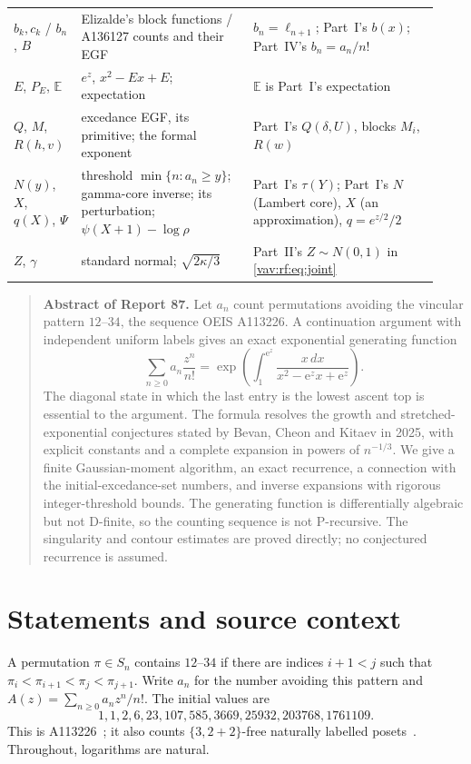 \documentclass[11pt]{article}
\theoremstyle{remark}\newtheorem{remark}[theorem]{Remark}
\newcommand{\E}{\mathbb E}
\newcommand{\ee}{\mathrm e}
\begin{document}
\begin{table}[H]
\begin{tabular}{@{}>{\raggedright}p{0.14\linewidth}>{\raggedright}p{0.38\linewidth}>{\raggedright\arraybackslash}p{0.41\linewidth}@{}}
$b_k,c_k$ / $b_n$, $B$ & Elizalde's block functions / A136127 counts and their EGF & $b_n=\ell_{n+1}$; Part~I's $b(x)$; Part~IV's $b_n=a_n/n!$\\
$E$, $P_E$, $\E$ & $e^z$, $x^2-Ex+E$; expectation & $\E$ is Part~I's expectation\\
$Q$, $M$, $R(h,v)$ & excedance EGF, its primitive; the formal exponent & Part~I's $Q(\delta,U)$, blocks $M_i$, $R(w)$\\
$N(y)$, $X$, $q(X)$, $\Psi$ & threshold $\min\{n:a_n\ge y\}$; gamma-core inverse; its perturbation; $\psi(X+1)-\log\rho$ & Part~I's $\tau(Y)$; Part~I's $N$ (Lambert core), $X$ (an approximation), $q=e^{z/2}/2$\\
$Z$, $\gamma$ & standard normal; $\sqrt{2\kappa/3}$ & Part~II's $Z\sim N(0,1)$ in \eqref{vav:rf:eq:joint}\\
\bottomrule
\end{tabular}
\end{table}

\begin{quote}\small
\textbf{Abstract of Report 87.}
Let $a_n$ count permutations avoiding the vincular pattern $12$--$34$,
the sequence OEIS A113226. A continuation argument with independent uniform
labels gives an exact exponential generating function
\[
 \sum_{n\ge0}a_n\frac{z^n}{n!}
 =\exp\left(\int_1^{\ee^z}\frac{x\,dx}{x^2-\ee^zx+\ee^z}\right).
\]
The diagonal state in which the last entry is the lowest ascent top is
essential to the argument. The formula resolves the growth and
stretched-exponential conjectures stated by Bevan, Cheon and Kitaev in 2025,
with explicit constants and a complete expansion in powers of $n^{-1/3}$.
We give a finite Gaussian-moment algorithm, an exact recurrence, a connection
with the initial-excedance-set numbers, and inverse expansions with rigorous
integer-threshold bounds. The generating function is differentially algebraic
but not D-finite, so the counting sequence is not P-recursive.
The singularity and contour estimates are proved
directly; no conjectured recurrence is assumed.
\end{quote}

\section{Statements and source context}\label{vav:dg:sec:intro}
A permutation $\pi\in S_n$ contains $12$--$34$ if there are indices
$i+1<j$ such that
$\pi_i<\pi_{i+1}<\pi_j<\pi_{j+1}$.
Write $a_n$ for the number avoiding this pattern and
$A(z)=\sum_{n\ge0}a_nz^n/n!$. The initial values are
\[
1,1,2,6,23,107,585,3669,25932,203768,1761109.
\]
This is A113226~\cite{oeis}; it also counts
$\{3,2+2\}$-free naturally labelled posets~\cite{bck}.
Throughout, logarithms are natural.
\end{document}
